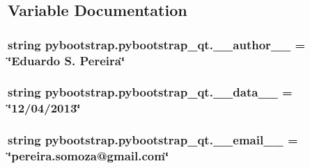\subsection{Variable Documentation}
\hypertarget{namespacepybootstrap_1_1pybootstrap__qt_abfed2364edd31091111a415a950e30b8}{
\subsubsection[{\-\_\-\-\_\-author\-\_\-\-\_\-}]{\setlength{\rightskip}{0pt plus 5cm}string pybootstrap.\-pybootstrap\-\_\-qt.\-\_\-\-\_\-author\-\_\-\-\_\- = \char`\"{}Eduardo S. Pereira\char`\"{}}}\label{namespacepybootstrap_1_1pybootstrap__qt_abfed2364edd31091111a415a950e30b8}
\hypertarget{namespacepybootstrap_1_1pybootstrap__qt_accbd3f836c279dd8a8752867c31afadb}{
\subsubsection[{\-\_\-\-\_\-data\-\_\-\-\_\-}]{\setlength{\rightskip}{0pt plus 5cm}string pybootstrap.\-pybootstrap\-\_\-qt.\-\_\-\-\_\-data\-\_\-\-\_\- = \char`\"{}12/04/2013\char`\"{}}}\label{namespacepybootstrap_1_1pybootstrap__qt_accbd3f836c279dd8a8752867c31afadb}
\hypertarget{namespacepybootstrap_1_1pybootstrap__qt_ad8f2c14d582942563a5e9d72d84676e6}{
\subsubsection[{\-\_\-\-\_\-email\-\_\-\-\_\-}]{\setlength{\rightskip}{0pt plus 5cm}string pybootstrap.\-pybootstrap\-\_\-qt.\-\_\-\-\_\-email\-\_\-\-\_\- = \char`\"{}pereira.\-somoza@gmail.\-com\char`\"{}}}\label{namespacepybootstrap_1_1pybootstrap__qt_ad8f2c14d582942563a5e9d72d84676e6}

